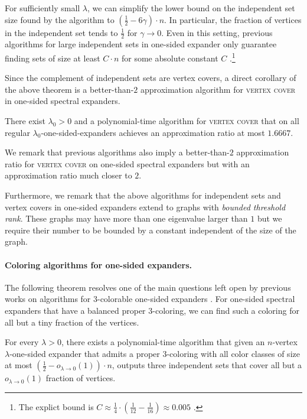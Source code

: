 For sufficiently small \(\lambda\), we can simplify the lower bound on the independent set size found by the algorithm to \((\tfrac 12 -6\gamma)\cdot n\).
In particular, the fraction of vertices in the independent set tends to \(\tfrac 12\) for \(\gamma\to 0\).
Even in this setting, previous algorithms for large independent sets in one-sided expander only guarantee finding sets of size at least \(C\cdot n\) for some absolute constant \(C\) \cite{bafna-hsieh-kothari}.\footnote{The explict bound is \(C\approx \tfrac 14 \cdot (\frac 1 {12}-\tfrac 1 {16})\approx 0.005\) \cite{bafna-hsieh-kothari}.}

Since the complement of independent sets are vertex covers, a direct corollary of the above theorem is a better-than-$2$ approximation algorithm for \textsc{vertex cover} in one-sided spectral expanders.

\begin{corollary}
  There exist \(\lambda_{0}>0\) and a polynomial-time algorithm for \textsc{vertex cover} that on all regular \(\lambda_{0}\)-one-sided-expanders achieves an approximation ratio at most \(1.6667\).
\end{corollary}

We remark that previous algorithms also imply a better-than-$2$ approximation ratio for \textsc{vertex cover} on one-sided spectral expanders but with an approximation ratio much closer to \(2\).

Furthermore, we remark that the above algorithms for independent sets and vertex covers in one-sided expanders extend to graphs with \emph{bounded threshold rank}.
These graphs may have more than one eigenvalue larger than \(1\) but we require their number to be bounded by a constant independent of the size of the graph.

\paragraph{Coloring algorithms for one-sided expanders.}

The following theorem resolves one of the main questions left open by previous works on algorithms for 3-colorable one-sided expanders \cite{bafna-hsieh-kothari}.
For one-sided spectral expanders that have a balanced proper 3-coloring, we can find such a coloring for all but a tiny fraction of the vertices.

\begin{theorem}
  For every \(\lambda>0\), there exists a polynomial-time algorithm that given an \(n\)-vertex \(\lambda\)-one-sided expander that admits a proper \(3\)-coloring with all color classes of size at most \((\tfrac 12 -o_{\lambda\to 0}(1))\cdot n\), outputs three independent sets that cover all but a \(o_{\lambda\to 0}(1)\) fraction of vertices.
\end{theorem}

